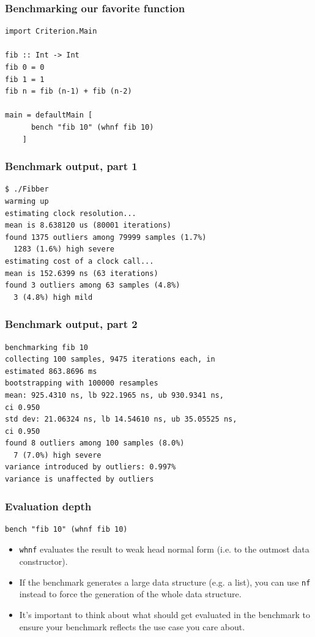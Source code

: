\documentclass{beamer}
\begin{document}
\begin{frame}[fragile]
  \frametitle{Benchmarking our favorite function}

  \begin{lstlisting}
import Criterion.Main

fib :: Int -> Int
fib 0 = 0
fib 1 = 1
fib n = fib (n-1) + fib (n-2)

main = defaultMain [
      bench "fib 10" (whnf fib 10)
    ]
  \end{lstlisting}
\end{frame}

\begin{frame}[fragile]
  \frametitle{Benchmark output, part 1}

  \begin{verbatim}
$ ./Fibber
warming up
estimating clock resolution...
mean is 8.638120 us (80001 iterations)
found 1375 outliers among 79999 samples (1.7%)
  1283 (1.6%) high severe
estimating cost of a clock call...
mean is 152.6399 ns (63 iterations)
found 3 outliers among 63 samples (4.8%)
  3 (4.8%) high mild
  \end{verbatim}
\end{frame}

\begin{frame}[fragile]
  \frametitle{Benchmark output, part 2}

  \begin{verbatim}
benchmarking fib 10
collecting 100 samples, 9475 iterations each, in
estimated 863.8696 ms
bootstrapping with 100000 resamples
mean: 925.4310 ns, lb 922.1965 ns, ub 930.9341 ns,
ci 0.950
std dev: 21.06324 ns, lb 14.54610 ns, ub 35.05525 ns,
ci 0.950
found 8 outliers among 100 samples (8.0%)
  7 (7.0%) high severe
variance introduced by outliers: 0.997%
variance is unaffected by outliers
  \end{verbatim}
\end{frame}

\begin{frame}[fragile]
  \frametitle{Evaluation depth}

  \begin{lstlisting}
bench "fib 10" (whnf fib 10)
  \end{lstlisting}

  \begin{itemize}
  \item \lstinline!whnf! evaluates the result to weak head normal form
    (i.e. to the outmost data constructor).
  \item If the benchmark generates a large data structure (e.g. a
    list), you can use \lstinline!nf! instead to force the generation
    of the whole data structure.
  \item It's important to think about what should get evaluated in the
    benchmark to ensure your benchmark reflects the use case you care
    about.
  \end{itemize}
\end{frame}
\end{document}
